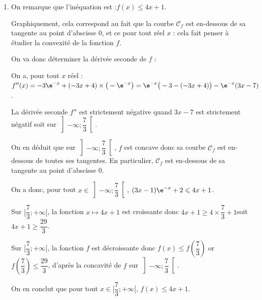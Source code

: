 \begin{enumerate}
\begin{enumerate}
			\item Sur l'intervalle $\big[0  ; 2 \big]$, la fonction $f$ est positive donc l'aire du domaine limité par la courbe $\mathcal{C}_f$, l'axe de abscisses et les droites d'équation $x = 0$ et $x = 2$ est $\mathcal{A}=\displaystyle \int_0^2 f(x) dx$.

			$\aligned[t] \mathcal{A}&=\displaystyle \int_0^2 f(x) dx \\
			&= \bigg[ F(x) \bigg]_0^2 \\
			&= F(2) - F(0) \\
			&= -8\e^2 +4 +2 \\
			&=6-8\e^2
			\endaligned$

			L'aire du domaine limité par la courbe $\mathcal{C}_f$, l'axe de abscisses et les droites d'équation $x = 0$ et $x = 2$ mesure $6-8\e^2$ unités d'aire.
		\end{enumerate}

		\item On remarque que l'inéquation est :\quad $f(x) \leqslant 4x + 1$.

		Graphiquement, cela correspond au fait que la courbe $\mathcal{C}_f$ est en-dessous de sa tangente au point d'abscisse 0, et ce pour tout réel $x$ : cela fait penser à étudier la convexité de la fonction $f$.

		On va donc déterminer la dérivée seconde de $f$ :

		On a, pour tout $x$ réel :\quad  $f''(x)= -3\e^{-x} + (-3x + 4)\times \big(-\e^{-x}\big) = \e^{-x} \big(-3 - (-3x+4)\big)-\e^{-x} (3x-7)$.

		La dérivée seconde $f''$ est strictement négative quand $3x-7$ est strictement négatif soit sur $\left] -\infty  ; \dfrac73 \right[$.

		On en déduit que sur $\left] -\infty  ; \dfrac73 \right[$, $f$ est concave donc sa courbe $\mathcal{C}_f$ est en-dessous de toutes ses tangentes. En particulier, $\mathcal{C}_f$ est en-dessous de sa tangente au point d'abscisse 0.

		On a donc, pour tout $x \in \left] -\infty  ; \dfrac73 \right[$, \quad $(3x - 1)\e^{-x} + 2 \leqslant 4x + 1$.

		Sur $\bigg[ \dfrac73  ; +\infty \bigg[$, la fonction \quad $x \longmapsto 4x+1$ \quad est croissante donc \quad $4x+1 \geqslant 4 \times \dfrac73 +1$\quad soit \quad $4x+1 \geqslant \dfrac{29}{3}$.

		Sur $\bigg[ \dfrac73  ; +\infty \bigg[$, la fonction $f$ est décroissante donc \quad $f(x) \leqslant f\left( \dfrac73 \right)$ \quad or $f\left( \dfrac73 \right) \leqslant \dfrac{29}{3}$, \quad d'après la concavité de $f$ sur $\left] -\infty  ; \dfrac73 \right[$.

		On en conclut que pour tout $x \in \bigg[ \dfrac73  ; +\infty \bigg[$, \quad $f(x) \leqslant 4x+1$.
	\end{enumerate}

